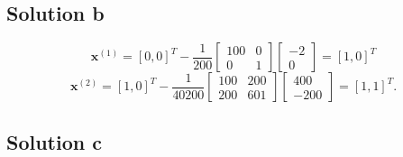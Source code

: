 \documentclass{article}
\newcommand{\bld}[1]{\boldsymbol{#1}}
\begin{document}
\subsection*{Solution b}
\[
	\bld{x}^{(1)}=[0,0]^T - \frac{1}{200}
	\begin{bmatrix}
		100 & 0 \\
		0 & 1
	\end{bmatrix}
	\begin{bmatrix}
		-2\\
		0
	\end{bmatrix}
	=
	[1,0]^T
\]
\[
	\bld{x}^{(2)}=[1,0]^T - \frac{1}{40200}
	\begin{bmatrix}
		100 & 200 \\
		200 & 601
	\end{bmatrix}
	\begin{bmatrix}
		400\\
		-200
	\end{bmatrix}
	=
	[1,1]^T.
\]
\subsection*{Solution c}
\end{document}
